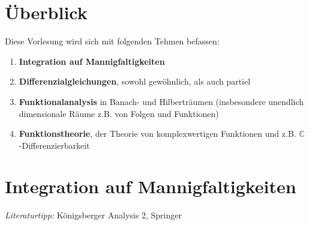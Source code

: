 \chapter*{Überblick}
Diese Vorlesung wird sich mit folgenden Tehmen befassen:
    \begin{enumerate}
    \item \textbf{Integration auf Mannigfaltigkeiten}
    \item \textbf{Differenzialgleichungen}, sowohl gewöhnlich, als auch partiel
    \item \textbf{Funktionalanalysis} in Banach- und Hilberträumen (insbesondere
    unendlich dimensionale Räume z.B. von Folgen und Funktionen)
    \item \textbf{Funktionstheorie}, der Theorie von komplexwertigen Funktionen
    und z.B. $\mathbb{C}$-Differenzierbarkeit
    \end{enumerate}

\chapter{Integration auf Mannigfaltigkeiten}
\emph{Literaturtipp:} Königsberger Analysis 2, Springer
\setcounter{section}{28}

